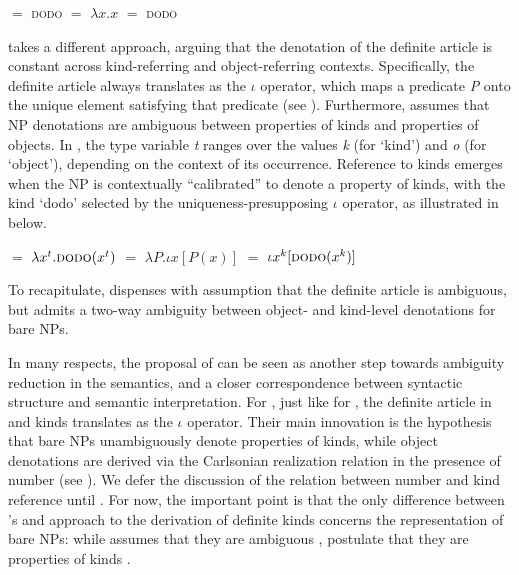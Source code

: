 \documentclass[output=paper]{langscibook}
\begin{document}
\ea \label{ex:deriv_krifka}
\ea {} $=$ \textsc{dodo}
\ex {} $=$ $\lambda x.x$
\ex {} $=$ \textsc{dodo}
\z \z

\noindent
\citet{Dayal2004} takes a different approach, arguing that the denotation of the definite article is constant across kind-referring and object-referring contexts. Specifically, the definite article always translates as the $\iota$ operator, which maps a predicate \textit{P} onto the unique element satisfying that predicate (see \citealt{Partee1987}). Furthermore, \citet{Dayal2004} assumes that NP denotations are ambiguous between properties of kinds and properties of objects. In , the type variable \textit{t} ranges over the values \textit{k} (for `kind') and \textit{o} (for `object'), depending on the context of its occurrence. Reference to kinds emerges when the NP is contextually ``calibrated'' to denote a property of kinds, with the kind `dodo' selected by the uniqueness-presupposing $\iota$ operator, as illustrated in  below.

\ea \label{ex:deriv_dayal}
\ea {} $=$ $\lambda x^t.\textsc{dodo}(x^t)$ \label{ex:deriv_dayal_1}
\ex {} $=$ $\lambda P.\iota x[P(x)]$
\ex {} $=$ $\iota x^k[\textsc{dodo}(x^k)]$ \label{ex:deriv_dayal_3}
\z \z



\noindent
To recapitulate, \citet{Dayal2004} dispenses with  assumption that the definite article is ambiguous, but admits a two-way ambiguity between object- and kind-level denotations for bare NPs.

In many respects, the proposal of \citet{Borik.Espinal2012,Borik.Espinal2015} can be seen as another step towards ambiguity reduction in the semantics, and a closer correspondence between syntactic structure and semantic interpretation. For \citeauthor{Borik.Espinal2012}, just like for \citet{Dayal2004}, the definite article in  and  kinds translates as the $\iota$ operator. Their main innovation is the hypothesis that bare NPs unambiguously denote properties of kinds, while object denotations are derived via the Carlsonian realization relation  in the presence of number (see \citealt{Carlson1977}). We defer the discussion of the relation between number and kind reference until . For now, the important point is that the only difference between \citeauthor{Borik.Espinal2012}'s and  approach to the derivation of definite kinds concerns the representation of bare NPs: while \citet{Dayal2004} assumes that they are ambiguous , \citeauthor{Borik.Espinal2012} postulate that they are properties of kinds .
\end{document}
